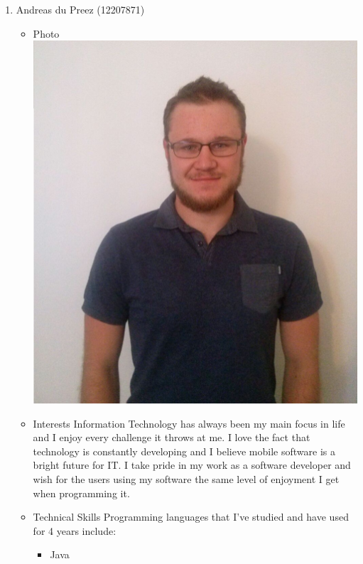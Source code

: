 \documentclass[12pt, oneside]{article}
\begin{document}
\begin{enumerate}
\begin{itemize}
						\end{itemize}
		\item {Andreas du Preez (12207871)\par}
		\begin{itemize}
			\item Photo\newline
				\includegraphics[scale=0.1]{Andreas} %
			\item Interests\newline
				Information Technology has always been my main focus in life and I enjoy every challenge it throws at me.
				I love the fact that technology is constantly developing and I believe mobile software is a bright future for IT. 
				I take pride in my work as a software developer and wish for the users using my software the same level of enjoyment I get when programming it.
			\item Technical Skills\newline
			Programming languages that I've studied and have used for 4 years include:
								\begin{itemize}
								\item Java\newline

\end{itemize}
\end{itemize}
\end{enumerate}
\end{document}
